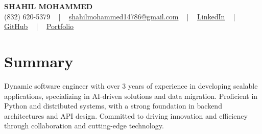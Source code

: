 \documentclass[letterpaper,10pt]{article}
\begin{document}
\begin{center}
    {\fontsize{14pt}{12pt}\selectfont \textbf{\MakeUppercase{Shahil Mohammed}}}\\ \vspace{2pt}
    \fontsize{10pt}{12pt}\selectfont (832) 620-5379 ~ | ~ \href{mailto:shahilmohammed14786@gmail.com}{shahilmohammed14786@gmail.com} ~ | ~  
    \href{https://www.linkedin.com/in/shahil-mohammed-9652931a1/}{\color{blue}\underline{LinkedIn}}  ~ | ~ 
    \href{https://github.com/freakbeast14}{\color{blue}\underline{GitHub}} ~ | ~ 
    \href{https://shahil-mohammed.netlify.app/}{\color{blue}\underline{Portfolio}}
    \vspace{-8pt}
\end{center}

\section{Summary}
\vspace{-2pt}\fontsize{8pt}{9pt}\selectfont
Dynamic software engineer with over 3 years of experience in developing scalable applications, specializing in AI-driven solutions and data migration. Proficient in Python and distributed systems, with a strong foundation in backend architectures and API design. Committed to driving innovation and efficiency through collaboration and cutting-edge technology.
 \vspace{-5pt}
 
\vspace{-2pt}
\end{document}
